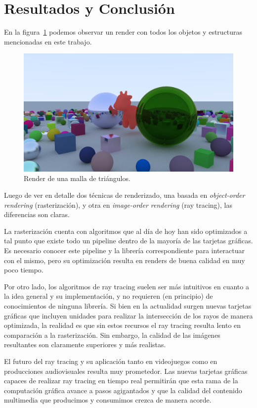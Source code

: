 \newpage
\section{Resultados y Conclusión} \label{sec:conclusion}

En la figura~\ref{fig:escena_final} podemos observar un render con todos los objetos y
estructuras mencionadas en este trabajo.

\begin{figure}[H]
    \centering
    \includegraphics[width=.9\textwidth]{imgs/escena_final}
    \caption{Render de una malla de triángulos.}
    \label{fig:escena_final}
\end{figure}

Luego de ver en detalle dos técnicas de renderizado, una basada en \textit{object-order
rendering} (rasterización), y otra en \textit{image-order rendering} (ray tracing), las
diferencias son claras.

La rasterización cuenta con algoritmos que al día de hoy han sido optimizados a tal punto que
existe todo un pipeline dentro de la mayoría de las tarjetas gráficas.
Es necesario conocer este pipeline y la librería correspondiente para interactuar con el mismo, pero
su optimización resulta en renders de buena calidad en muy poco tiempo.

Por otro lado, los algoritmos de ray tracing suelen ser más intuitivos en cuanto a la idea
general y su implementación, y no requieren (en principio) de conocimientos de ninguna librería.
Si bien en la actualidad surgen nuevas tarjetas gráficas que incluyen unidades para realizar la
intersección de los rayos de manera optimizada, la realidad es que sin estos recursos el ray
tracing resulta lento en comparación a la rasterización.
Sin embargo, la calidad de las imágenes resultantes son claramente superiores y más realistas.

El futuro del ray tracing y su aplicación tanto en videojuegos como en producciones audiovisuales
resulta muy prometedor.
Las nuevas tarjetas gráficas capaces de realizar ray tracing en tiempo real permitirán que esta
rama de la computación gráfica avance a pasos agigantados y que la calidad del
contenido multimedia que producimos y consumimos crezca de manera acorde.